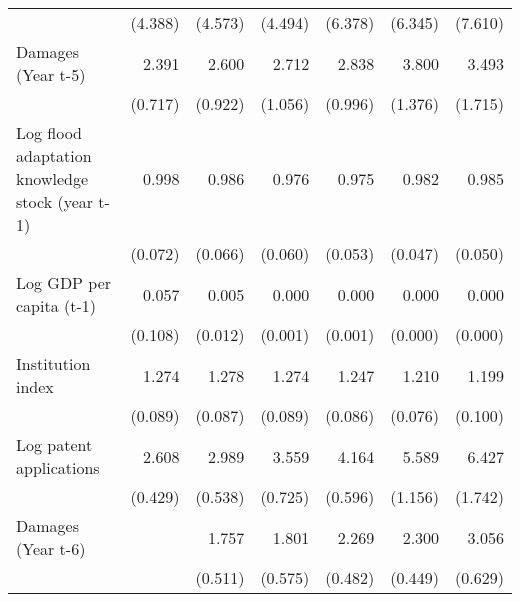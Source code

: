 \begin{table}[htbp]
\begin{tabular}{l*{6}{D{.}{.}{-1}}}
                    &     (4.388)         &     (4.573)         &     (4.494)         &     (6.378)         &     (6.345)         &     (7.610)         \\
\addlinespace
Damages (Year t-5)  &       2.391\sym{***}&       2.600\sym{***}&       2.712\sym{**} &       2.838\sym{***}&       3.800\sym{***}&       3.493\sym{**} \\
                    &     (0.717)         &     (0.922)         &     (1.056)         &     (0.996)         &     (1.376)         &     (1.715)         \\
\addlinespace
Log flood adaptation knowledge stock (year t-1)&       0.998         &       0.986         &       0.976         &       0.975         &       0.982         &       0.985         \\
                    &     (0.072)         &     (0.066)         &     (0.060)         &     (0.053)         &     (0.047)         &     (0.050)         \\
\addlinespace
Log GDP per capita (t-1)&       0.057\sym{\%}  &       0.005\sym{**} &       0.000\sym{***}&       0.000\sym{***}&       0.000\sym{***}&       0.000\sym{***}\\
                    &     (0.108)         &     (0.012)         &     (0.001)         &     (0.001)         &     (0.000)         &     (0.000)         \\
\addlinespace
Institution index   &       1.274\sym{***}&       1.278\sym{***}&       1.274\sym{***}&       1.247\sym{***}&       1.210\sym{***}&       1.199\sym{**} \\
                    &     (0.089)         &     (0.087)         &     (0.089)         &     (0.086)         &     (0.076)         &     (0.100)         \\
\addlinespace
Log patent applications&       2.608\sym{***}&       2.989\sym{***}&       3.559\sym{***}&       4.164\sym{***}&       5.589\sym{***}&       6.427\sym{***}\\
                    &     (0.429)         &     (0.538)         &     (0.725)         &     (0.596)         &     (1.156)         &     (1.742)         \\
\addlinespace
Damages (Year t-6)  &                     &       1.757\sym{*}  &       1.801\sym{*}  &       2.269\sym{***}&       2.300\sym{***}&       3.056\sym{***}\\
                    &                     &     (0.511)         &     (0.575)         &     (0.482)         &     (0.449)         &     (0.629)         \\

\end{tabular}
\end{table}
